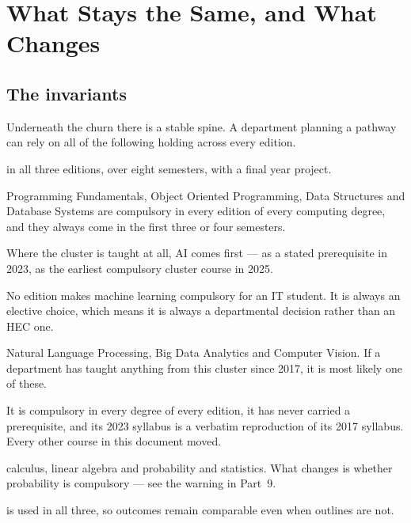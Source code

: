 \documentclass[11pt,a4paper,oneside]{report}
\begin{document}
\section{What Stays the Same, and What Changes}

\subsection{The invariants}

Underneath the churn there is a stable spine. A department planning a pathway can
rely on all of the following holding across every edition.

\begin{tightnum}
  \item {} in all three editions, over eight
        semesters, with a final year project.
  \item {} Programming
        Fundamentals, Object Oriented Programming, Data Structures and Database
        Systems are compulsory in every edition of every computing degree, and
        they always come in the first three or four semesters.
  \item {} Where the cluster is
        taught at all, AI comes first --- as a stated prerequisite in 2023, as
        the earliest compulsory cluster course in 2025.
  \item {} No edition makes
        machine learning compulsory for an IT student. It is always an elective
        choice, which means it is always a departmental decision rather than an
        HEC one.
  \item {} Natural Language
        Processing, Big Data Analytics and Computer Vision. If a department has
        taught anything from this cluster since 2017, it is most likely one of
        these.
  \item {} It is compulsory in
        every degree of every edition, it has never carried a prerequisite, and
        its 2023 syllabus is a verbatim reproduction of its 2017 syllabus. Every
        other course in this document moved.
  \item {} calculus, linear
        algebra and probability and statistics. What changes is whether
        probability is compulsory --- see the warning in Part~9.
  \item {} is used in
        all three, so outcomes remain comparable even when outlines are not.
\end{tightnum}
\end{document}
